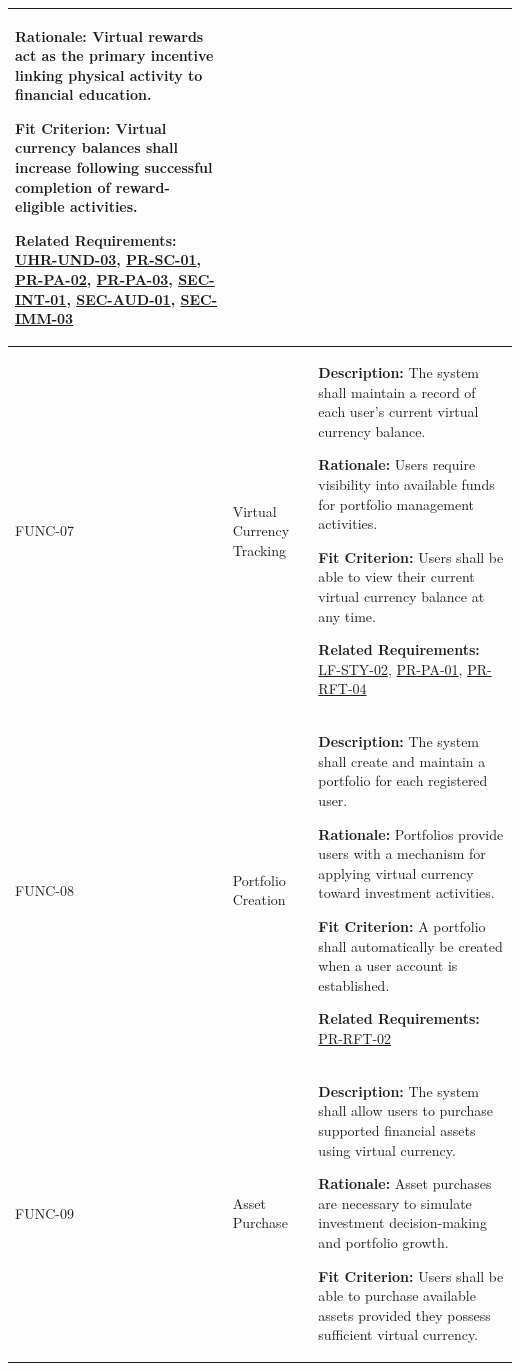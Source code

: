 \documentclass[12pt]{article}
\begin{document}
\begin{xltabular}{\textwidth}{|p{2.6cm}|p{3.4cm}|X|}
\textbf{Rationale:} Virtual rewards act as the primary incentive linking physical activity to financial education.

\textbf{Fit Criterion:} Virtual currency balances shall increase following successful completion of reward-eligible activities.

\textbf{Related Requirements:} \hyperlink{req:UHR-UND-03}{UHR-UND-03}, \hyperlink{req:PR-SC-01}{PR-SC-01}, \hyperlink{req:PR-PA-02}{PR-PA-02}, \hyperlink{req:PR-PA-03}{PR-PA-03}, \hyperlink{req:SEC-INT-01}{SEC-INT-01}, \hyperlink{req:SEC-AUD-01}{SEC-AUD-01}, \hyperlink{req:SEC-IMM-03}{SEC-IMM-03}\\
\hline

FUNC-07\hypertarget{req:FUNC-07}{} & 
Virtual Currency Tracking & 
\textbf{Description:} The system shall maintain a record of each user's current virtual currency balance.

\textbf{Rationale:} Users require visibility into available funds for portfolio management activities.

\textbf{Fit Criterion:} Users shall be able to view their current virtual currency balance at any time.

\textbf{Related Requirements:} \hyperlink{req:LF-STY-02}{LF-STY-02}, \hyperlink{req:PR-PA-01}{PR-PA-01}, \hyperlink{req:PR-RFT-04}{PR-RFT-04}\\
\hline

FUNC-08\hypertarget{req:FUNC-08}{} & 
Portfolio Creation & 
\textbf{Description:} The system shall create and maintain a portfolio for each registered user.

\textbf{Rationale:} Portfolios provide users with a mechanism for applying virtual currency toward investment activities.

\textbf{Fit Criterion:} A portfolio shall automatically be created when a user account is established.

\textbf{Related Requirements:} \hyperlink{req:PR-RFT-02}{PR-RFT-02}\\
\hline

FUNC-09\hypertarget{req:FUNC-09}{} & 
Asset Purchase & 
\textbf{Description:} The system shall allow users to purchase supported financial assets using virtual currency.

\textbf{Rationale:} Asset purchases are necessary to simulate investment decision-making and portfolio growth.

\textbf{Fit Criterion:} Users shall be able to purchase available assets provided they possess sufficient virtual currency.


\end{xltabular}
\end{document}
